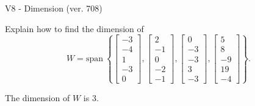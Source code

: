 \begin{exercise}
  \begin{exerciseTitle}V8 - Dimension (ver. 708)\end{exerciseTitle}
  \begin{exerciseStatement}
    Explain how to find the dimension of 
\[W=\mathrm{span}\ \left\{\left[\begin{array}{r}
-3 \\
-4 \\
1 \\
-3 \\
0
\end{array}\right] , \left[\begin{array}{r}
2 \\
-1 \\
0 \\
-2 \\
-1
\end{array}\right] , \left[\begin{array}{r}
0 \\
-3 \\
-3 \\
3 \\
-3
\end{array}\right] , \left[\begin{array}{r}
5 \\
8 \\
-9 \\
19 \\
-4
\end{array}\right]\right\}.\]



  \end{exerciseStatement}
  \begin{exerciseAnswer}
   The dimension of \(W\) is  \(3\).
  


  \end{exerciseAnswer}
\end{exercise}